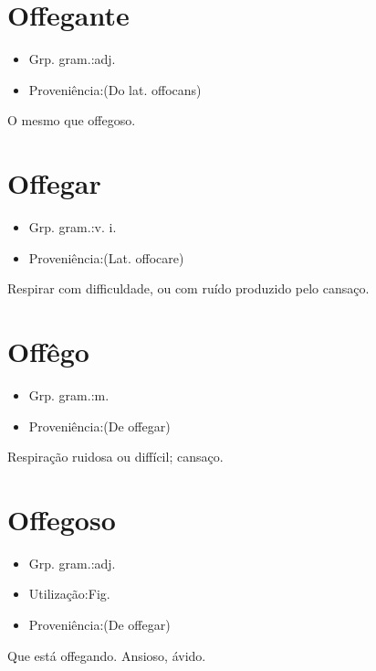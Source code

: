 \section{Offegante}
\begin{itemize}
\item {Grp. gram.:adj.}
\end{itemize}
\begin{itemize}
\item {Proveniência:(Do lat. \textunderscore offocans\textunderscore )}
\end{itemize}
O mesmo que \textunderscore offegoso\textunderscore .
\section{Offegar}
\begin{itemize}
\item {Grp. gram.:v. i.}
\end{itemize}
\begin{itemize}
\item {Proveniência:(Lat. \textunderscore offocare\textunderscore )}
\end{itemize}
Respirar com difficuldade, ou com ruído produzido pelo cansaço.
\section{Offêgo}
\begin{itemize}
\item {Grp. gram.:m.}
\end{itemize}
\begin{itemize}
\item {Proveniência:(De \textunderscore offegar\textunderscore )}
\end{itemize}
Respiração ruidosa ou diffícil; cansaço.
\section{Offegoso}
\begin{itemize}
\item {Grp. gram.:adj.}
\end{itemize}
\begin{itemize}
\item {Utilização:Fig.}
\end{itemize}
\begin{itemize}
\item {Proveniência:(De \textunderscore offegar\textunderscore )}
\end{itemize}
Que está offegando.
Ansioso, ávido.
